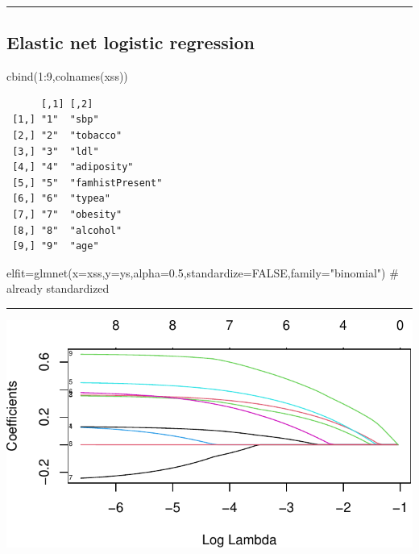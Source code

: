 \documentclass[
  letterpaper,
  DIV=11,
  numbers=noendperiod]{scrartcl}
\newenvironment{Shaded}{\begin{snugshade}}{\end{snugshade}}
\newcommand{\AttributeTok}[1]{\textcolor[rgb]{0.40,0.45,0.13}{#1}}
\newcommand{\CommentTok}[1]{\textcolor[rgb]{0.37,0.37,0.37}{#1}}
\newcommand{\ConstantTok}[1]{\textcolor[rgb]{0.56,0.35,0.01}{#1}}
\newcommand{\DecValTok}[1]{\textcolor[rgb]{0.68,0.00,0.00}{#1}}
\newcommand{\FloatTok}[1]{\textcolor[rgb]{0.68,0.00,0.00}{#1}}
\newcommand{\FunctionTok}[1]{\textcolor[rgb]{0.28,0.35,0.67}{#1}}
\newcommand{\NormalTok}[1]{\textcolor[rgb]{0.00,0.23,0.31}{#1}}
\newcommand{\OtherTok}[1]{\textcolor[rgb]{0.00,0.23,0.31}{#1}}
\newcommand{\SpecialCharTok}[1]{\textcolor[rgb]{0.37,0.37,0.37}{#1}}
\newcommand{\StringTok}[1]{\textcolor[rgb]{0.13,0.47,0.30}{#1}}
\begin{document}
\begin{center}\rule{0.5\linewidth}{0.5pt}\end{center}

\hypertarget{elastic-net-logistic-regression}{%
\subsection{Elastic net logistic
regression}\label{elastic-net-logistic-regression}}

\begin{Shaded}
\begin{Highlighting}[]
\FunctionTok{cbind}\NormalTok{(}\DecValTok{1}\SpecialCharTok{:}\DecValTok{9}\NormalTok{,}\FunctionTok{colnames}\NormalTok{(xss))}
\end{Highlighting}
\end{Shaded}

\begin{verbatim}
      [,1] [,2]            
 [1,] "1"  "sbp"           
 [2,] "2"  "tobacco"       
 [3,] "3"  "ldl"           
 [4,] "4"  "adiposity"     
 [5,] "5"  "famhistPresent"
 [6,] "6"  "typea"         
 [7,] "7"  "obesity"       
 [8,] "8"  "alcohol"       
 [9,] "9"  "age"           
\end{verbatim}

\begin{Shaded}
\begin{Highlighting}[]
\NormalTok{elfit}\OtherTok{=}\FunctionTok{glmnet}\NormalTok{(}\AttributeTok{x=}\NormalTok{xss,}\AttributeTok{y=}\NormalTok{ys,}\AttributeTok{alpha=}\FloatTok{0.5}\NormalTok{,}\AttributeTok{standardize=}\ConstantTok{FALSE}\NormalTok{,}\AttributeTok{family=}\StringTok{"binomial"}\NormalTok{) }\CommentTok{\# already standardized}
\end{Highlighting}
\end{Shaded}

\begin{center}\rule{0.5\linewidth}{0.5pt}\end{center}

\includegraphics{L10_files/figure-pdf/unnamed-chunk-19-1.pdf}
\end{document}
